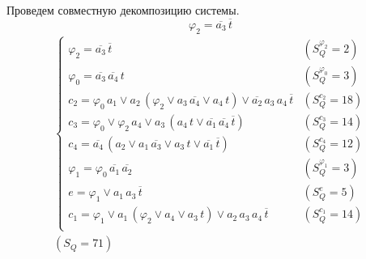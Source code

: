 \documentclass{article}
\begin{document}
\noindent\begin{minipage}{\textwidth}
Проведем совместную декомпозицию системы. \[\varphi_{2} = \overline{a_3}\,\overline{t}\]
\[\begin{matrix}
    \begin{cases}
        \varphi_{2} = \overline{a_3}\,\overline{t} & (S_Q^{\varphi_{2}} = 2) \\
        \varphi_{0} = \overline{a_3}\,\overline{a_4}\,t & (S_Q^{\varphi_{0}} = 3) \\
        c_2 = \varphi_{0}\,a_1 \lor a_2\,\left(\varphi_{2} \lor a_3\,\overline{a_4} \lor a_4\,t\right) \lor \overline{a_2}\,a_3\,a_4\,\overline{t} & (S_Q^{c_2} = 18) \\
        c_3 = \varphi_{0} \lor \varphi_{2}\,a_4 \lor a_3\,\left(a_4\,t \lor \overline{a_1}\,\overline{a_4}\,\overline{t}\right) & (S_Q^{c_3} = 14) \\
        c_4 = \overline{a_4}\,\left(a_2 \lor a_1\,\overline{a_3} \lor a_3\,t \lor \overline{a_1}\,\overline{t}\right) & (S_Q^{c_4} = 12) \\
        \varphi_{1} = \varphi_{0}\,\overline{a_1}\,\overline{a_2} & (S_Q^{\varphi_{1}} = 3) \\
        e = \varphi_{1} \lor a_1\,a_3\,\overline{t} & (S_Q^{e} = 5) \\
        c_1 = \varphi_{1} \lor a_1\,\left(\varphi_{2} \lor a_4 \lor a_3\,t\right) \lor a_2\,a_3\,a_4\,\overline{t} & (S_Q^{c_1} = 14) \\
    \end{cases} \\ (S_Q = 71)
\end{matrix}\] \\ \phantom{0}
\end{minipage}
\end{document}
